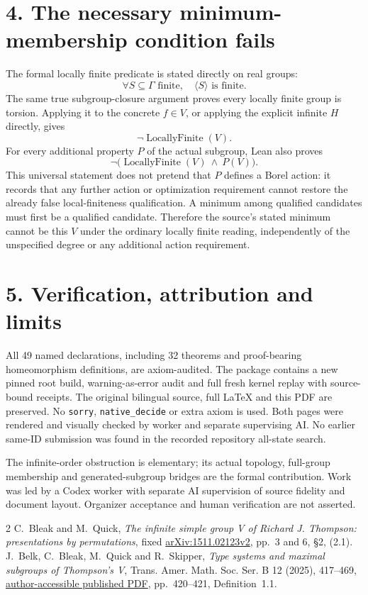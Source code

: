 \documentclass[10pt]{article}
\begin{document}
\section*{4. The necessary minimum-membership condition fails}
The formal locally finite predicate is stated directly on real groups:
\[
 \forall S\subseteq\Gamma\text{ finite},\quad\langle S\rangle\text{ is finite}.
\]
The same true subgroup-closure argument proves every locally finite group is torsion. Applying it to the concrete $f\in V$, or applying the explicit infinite $H$ directly, gives
\[
 \neg\operatorname{LocallyFinite}(V).
\]
For every additional property $P$ of the actual subgroup, Lean also proves
\[
 \neg\bigl(\operatorname{LocallyFinite}(V)\ \wedge\ P(V)\bigr).
\]
This universal statement does not pretend that $P$ defines a Borel action: it records that any further action or optimization requirement cannot restore the already false local-finiteness qualification. A minimum among qualified candidates must first be a qualified candidate. Therefore the source's stated minimum cannot be this $V$ under the ordinary locally finite reading, independently of the unspecified degree or any additional action requirement.

\section*{5. Verification, attribution and limits}
All 49 named declarations, including 32 theorems and proof-bearing homeomorphism definitions, are axiom-audited. The package contains a new pinned root build, warning-as-error audit and full fresh kernel replay with source-bound receipts. The original bilingual source, full LaTeX and this PDF are preserved. No \texttt{sorry}, \texttt{native\_decide} or extra axiom is used. Both pages were rendered and visually checked by worker and separate supervising AI. No earlier same-ID submission was found in the recorded repository all-state search.

The infinite-order obstruction is elementary; its actual topology, full-group membership and generated-subgroup bridges are the formal contribution. Work was led by a Codex worker with separate AI supervision of source fidelity and document layout. Organizer acceptance and human verification are not asserted.

\begin{thebibliography}{2}
 C.~Bleak and M.~Quick, \emph{The infinite simple group V of Richard J. Thompson: presentations by permutations}, fixed \href{https://arxiv.org/pdf/1511.02123v2}{arXiv:1511.02123v2}, pp.~3 and 6, \S2, (2.1).
 J.~Belk, C.~Bleak, M.~Quick and R.~Skipper, \emph{Type systems and maximal subgroups of Thompson's V}, Trans. Amer. Math. Soc. Ser. B 12 (2025), 417--469, \href{https://eprints.gla.ac.uk/328840/2/328840.pdf}{author-accessible published PDF}, pp.~420--421, Definition~1.1.
\end{thebibliography}
\end{document}
